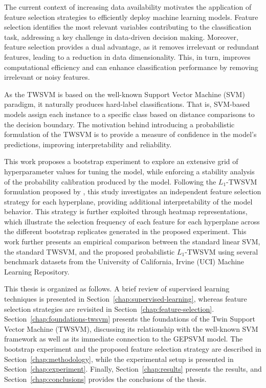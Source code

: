\documentclass[12pt]{report} %
\begin{document}
\newpage

The current context of increasing data availability motivates the application of feature selection strategies to efficiently deploy machine learning models. Feature selection identifies the most relevant variables contributing to the classification task, addressing a key challenge in data-driven decision making. Moreover, feature selection provides a dual advantage, as it removes irrelevant or redundant features, leading to a reduction in data dimensionality. This, in turn, improves computational efficiency and can enhance classification performance by removing irrelevant or noisy features.

As the TWSVM is based on the well-known Support Vector Machine (SVM) paradigm, it naturally produces hard-label classifications. That is, SVM-based models assign each instance to a specific class based on distance comparisons to the decision boundary. The motivation behind introducing a probabilistic formulation of the TWSVM is to provide a measure of confidence in the model's predictions, improving interpretability and reliability.

This work proposes a bootstrap experiment to explore an extensive grid of hyperparameter values for tuning the model, while enforcing a stability analysis of the probability calibration produced by the model. Following the $L_1$-TWSVM formulation proposed by \cite{bai2014novel}, this study investigates an independent feature selection strategy for each hyperplane, providing additional interpretability of the model behavior. This strategy is further exploited through heatmap representations, which illustrate the selection frequency of each feature for each hyperplane across the different bootstrap replicates generated in the proposed experiment. This work further presents an empirical comparison between the standard linear SVM, the standard TWSVM, and the proposed probabilistic $L_1$-TWSVM using several benchmark datasets from the University of California, Irvine (UCI) Machine Learning Repository.

This thesis is organized as follows. A brief review of supervised learning techniques is presented in Section~\ref{chap:supervised-learning}, whereas feature selection strategies are revisited in Section~\ref{chap:feature-selection}. Section~\ref{chap:foundations-twsvm} presents the foundations of the Twin Support Vector Machine (TWSVM), discussing its relationship with the well-known SVM framework as well as its immediate connection to the GEPSVM model. The bootstrap experiment and the proposed feature selection strategy are described in Section~\ref{chap:methodology}, while the experimental setup is presented in Section~\ref{chap:experiment}. Finally, Section~\ref{chap:results} presents the results, and Section~\ref{chap:conclusions} provides the conclusions of the thesis.
\end{document}
